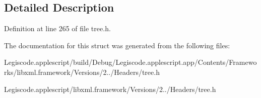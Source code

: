 \subsection{Detailed Description}


Definition at line 265 of file tree.\-h.



The documentation for this struct was generated from the following files\-:\begin{DoxyCompactItemize}
\item 
Legiscode.\-applescript/build/\-Debug/\-Legiscode.\-applescript.\-app/\-Contents/\-Frameworks/libxml.\-framework/\-Versions/2../\-Headers/tree.\-h\item 
Legiscode.\-applescript/libxml.\-framework/\-Versions/2../\-Headers/tree.\-h\end{DoxyCompactItemize}
